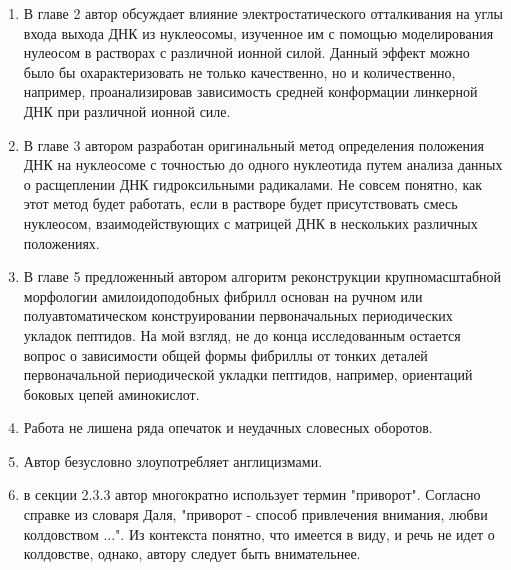 \begin{frame}[allowframebreaks]
\begin{enumerate}
        \item    В главе 2 автор обсуждает влияние электростатического отталкивания на углы входа выхода ДНК из нуклеосомы, изученное им с помощью моделирования нулеосом в растворах с различной ионной силой. Данный эффект можно было бы охарактеризовать не только качественно, но и количественно, например, проанализировав зависимость средней конформации линкерной ДНК при различной ионной силе.
    \item  В главе 3 автором разработан оригинальный метод определения положения ДНК на нуклеосоме с точностью до одного нуклеотида путем анализа данных о расщеплении ДНК гидроксильными радикалами. Не совсем понятно, как этот метод будет работать, если в растворе будет присутствовать смесь нуклеосом, взаимодействующих с матрицей ДНК в нескольких различных положениях.
    \item   В главе 5 предложенный автором алгоритм реконструкции крупномасштабной морфологии амилоидоподобных фибрилл основан на ручном или полуавтоматическом конструировании первоначальных периодических укладок пептидов. На мой взгляд, не до конца исследованным остается вопрос о зависимости общей формы фибриллы от тонких деталей первоначальной периодической укладки пептидов, например, ориентаций боковых цепей аминокислот.
    \item   Работа не лишена ряда опечаток и неудачных словесных оборотов. 
    \item Автор безусловно злоупотребляет англицизмами.
    \item в секции 2.3.3 автор многократно использует термин "приворот". Согласно справке из словаря Даля, "приворот - способ привлечения внимания, любви колдовством ...". Из контекста понятно, что имеется в виду, и речь не идет о колдовстве, однако, автору следует быть внимательнее.





    \end{enumerate}
\end{frame}

